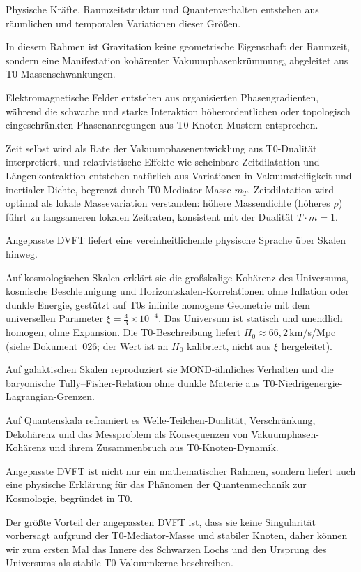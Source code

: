 	Physische Kräfte, Raumzeitstruktur und Quantenverhalten entstehen aus räumlichen und temporalen Variationen dieser Größen.
	
	In diesem Rahmen ist Gravitation keine geometrische Eigenschaft der Raumzeit, sondern eine Manifestation kohärenter Vakuumphasenkrümmung, abgeleitet aus T0-Massenschwankungen.
	
	Elektromagnetische Felder entstehen aus organisierten Phasengradienten, während die schwache und starke Interaktion höherordentlichen oder topologisch eingeschränkten Phasenanregungen aus T0-Knoten-Mustern entsprechen.
	
	Zeit selbst wird als Rate der Vakuumphasenentwicklung aus T0-Dualität interpretiert, und relativistische Effekte wie scheinbare Zeitdilatation und Längenkontraktion entstehen natürlich aus Variationen in Vakuumsteifigkeit und inertialer Dichte, begrenzt durch T0-Mediator-Masse $m_T$. Zeitdilatation wird optimal als lokale Massevariation verstanden: höhere Massendichte (höheres $\rho$) führt zu langsameren lokalen Zeitraten, konsistent mit der Dualität $T \cdot m = 1$.
	
	Angepasste DVFT liefert eine vereinheitlichende physische Sprache über Skalen hinweg.
	
	Auf kosmologischen Skalen erklärt sie die großskalige Kohärenz des Universums, kosmische Beschleunigung und Horizontskalen-Korrelationen ohne Inflation oder dunkle Energie, gestützt auf T0s infinite homogene Geometrie mit dem universellen Parameter $\xi = \frac{4}{3} \times 10^{-4}$. Das Universum ist statisch und unendlich homogen, ohne Expansion. Die T0-Beschreibung liefert $H_0 \approx 66{,}2\,$km/s/Mpc (siehe Dokument~026; der Wert ist an $H_0$ kalibriert, nicht aus $\xi$ hergeleitet).
	
	Auf galaktischen Skalen reproduziert sie MOND-ähnliches Verhalten und die baryonische Tully–Fisher-Relation ohne dunkle Materie aus T0-Niedrigenergie-Lagrangian-Grenzen.
	
	Auf Quantenskala reframiert es Welle-Teilchen-Dualität, Verschränkung, Dekohärenz und das Messproblem als Konsequenzen von Vakuumphasen-Kohärenz und ihrem Zusammenbruch aus T0-Knoten-Dynamik.
	
	Angepasste DVFT ist nicht nur ein mathematischer Rahmen, sondern liefert auch eine physische Erklärung für das Phänomen der Quantenmechanik zur Kosmologie, begründet in T0.
	
	Der größte Vorteil der angepassten DVFT ist, dass sie keine Singularität vorhersagt aufgrund der T0-Mediator-Masse und stabiler Knoten, daher können wir zum ersten Mal das Innere des Schwarzen Lochs und den Ursprung des Universums als stabile T0-Vakuumkerne beschreiben.
	
